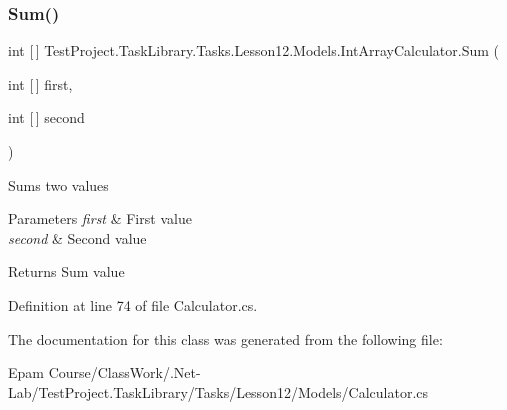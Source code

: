\subsubsection{\texorpdfstring{Sum()}{Sum()}}
{\footnotesize\ttfamily int \mbox{[}$\,$\mbox{]} Test\+Project.\+Task\+Library.\+Tasks.\+Lesson12.\+Models.\+Int\+Array\+Calculator.\+Sum (\begin{DoxyParamCaption}\item[{int \mbox{[}$\,$\mbox{]}}]{first,  }\item[{int \mbox{[}$\,$\mbox{]}}]{second }\end{DoxyParamCaption})}



Sums two values 


\begin{DoxyParams}{Parameters}
{\em first} & First value\\
\hline
{\em second} & Second value\\
\hline
\end{DoxyParams}
\begin{DoxyReturn}{Returns}
Sum value
\end{DoxyReturn}


Definition at line 74 of file Calculator.\+cs.



The documentation for this class was generated from the following file\+:\begin{DoxyCompactItemize}
\item 
Epam Course/\+Class\+Work/.\+Net-\/\+Lab/\+Test\+Project.\+Task\+Library/\+Tasks/\+Lesson12/\+Models/Calculator.\+cs\end{DoxyCompactItemize}
